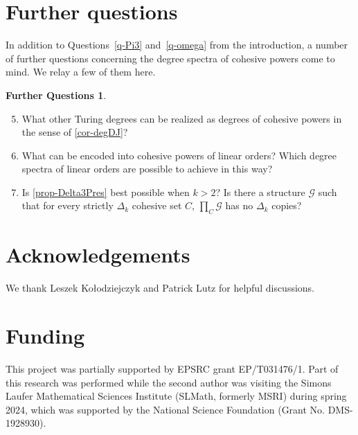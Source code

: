 \documentclass[11pt,a4paper,reqno]{amsart}
\theoremstyle{definition}
\newtheorem*{FQuestions*}{Further Questions}
\newcommand{\mc}[1]{\mathcal{#1}}
\begin{document}
\section{Further questions}\label{sec-q}

In addition to Questions~\ref{q-Pi3} and~\ref{q-omega} from the introduction, a number of further questions concerning the degree spectra of cohesive powers come to mind.  We relay a few of them here.

\begin{FQuestions*}\
\begin{enumerate}[(1)]
\setcounter{enumi}{4}
\item What other Turing degrees can be realized as degrees of cohesive powers in the sense of \cref{cor-degDJ}?

\medskip

\item What can be encoded into cohesive powers of linear orders?  Which degree spectra of linear orders are possible to achieve in this way?

\medskip

\item Is \cref{prop-Delta3Pres} best possible when $k>2$? Is there a structure $\mathcal{G}$ such that for every strictly $\Delta_k$ cohesive set $C$, $\prod_C\mc{G}$ has no $\Delta_k$ copies?
\end{enumerate}
\end{FQuestions*}

\section*{Acknowledgements}
We thank Leszek Ko{\l}odziejczyk and Patrick Lutz for helpful discussions.

\section*{Funding}
This project was partially supported by EPSRC grant EP/T031476/1.  Part of this research was performed while the second author was visiting the Simons Laufer Mathematical Sciences Institute (SLMath, formerly MSRI) during spring 2024, which was supported by the National Science Foundation (Grant No. DMS-1928930).





\vfill
\end{document}
